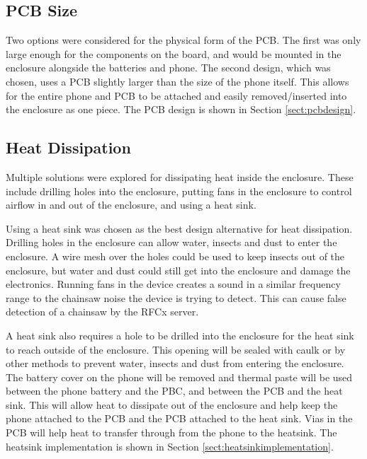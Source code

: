 \documentclass{article}
\numberwithin{figure}{section}
\numberwithin{equation}{section}
\begin{document}
{\subsection{PCB Size} \label{sect:pcb_just}
Two options were considered for the physical form of the PCB. The first was only large enough for the components on the board, and would be mounted in the enclosure alongside the batteries and phone. The second design, which was chosen, uses a PCB slightly larger than the size of the phone itself. This allows for the entire phone and PCB to be attached and easily removed/inserted into the enclosure as one piece. The PCB design is shown in Section \ref{sect:pcbdesign}.

\subsection{Heat Dissipation} \label{sect:heat_just}
Multiple solutions were explored for dissipating heat inside the enclosure. These include drilling holes into the enclosure, putting fans in the enclosure to control airflow in and out of the enclosure, and using a heat sink.

\bigskip
Using a heat sink was chosen as the best design alternative for heat dissipation. Drilling holes in the enclosure can allow water, insects and dust to enter the enclosure. A wire mesh over the holes could be used to keep insects out of the enclosure, but water and dust could still get into the enclosure and damage the electronics. Running fans in the device creates a sound in a similar frequency range to the chainsaw noise the device is trying to detect. This can cause false detection of a chainsaw by the RFCx server.

\bigskip
A heat sink also requires a hole to be drilled into the enclosure for the heat sink to reach outside of the enclosure. This opening will be sealed with caulk or by other methods to prevent water, insects and dust from entering the enclosure. The battery cover on the phone will be removed and thermal paste will be used between the phone battery and the PBC, and between the PCB and the heat sink. This will allow heat to dissipate out of the enclosure and help keep the phone attached to the PCB and the PCB attached to the heat sink. Vias in the PCB will help heat to transfer through from the phone to the heatsink. The heatsink implementation is shown in Section \ref{sect:heatsinkimplementation}.

}
\end{document}
